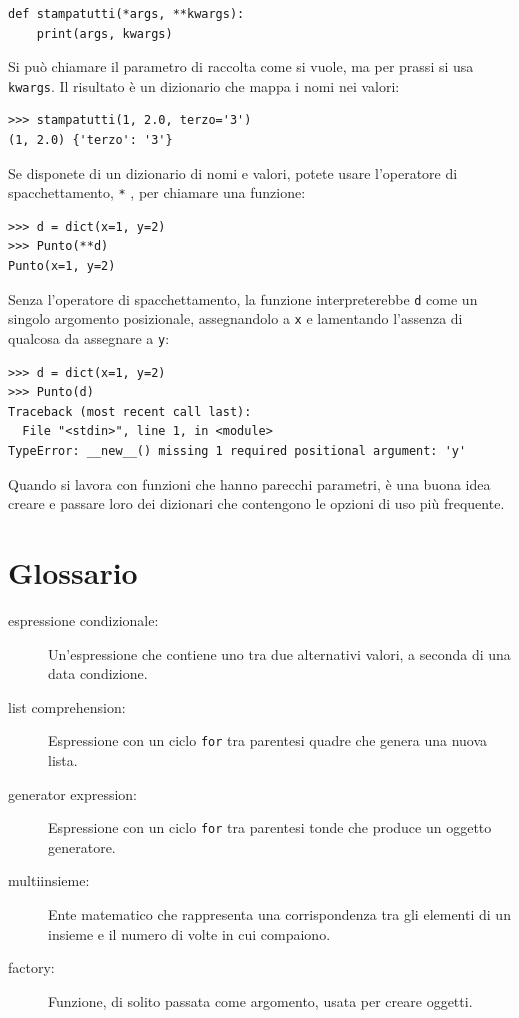 \documentclass[10pt]{book}
\begin{document}
\begin{verbatim}
def stampatutti(*args, **kwargs):
    print(args, kwargs)
\end{verbatim}
%
Si può chiamare il parametro di raccolta come si vuole, ma per prassi si usa
{\tt kwargs}.  Il risultato è un dizionario che mappa i nomi nei valori:

\begin{verbatim}
>>> stampatutti(1, 2.0, terzo='3')
(1, 2.0) {'terzo': '3'}
\end{verbatim}
%
Se disponete di un dizionario di nomi e valori, potete usare l'operatore di spacchettamento, {\tt **} , per chiamare una funzione:

\begin{verbatim}
>>> d = dict(x=1, y=2)
>>> Punto(**d)
Punto(x=1, y=2)
\end{verbatim}
%
Senza l'operatore di spacchettamento, la funzione interpreterebbe {\tt d} come un singolo argomento posizionale, assegnandolo a {\tt x} e lamentando l'assenza di qualcosa da assegnare a {\tt y}:

\begin{verbatim}
>>> d = dict(x=1, y=2)
>>> Punto(d)
Traceback (most recent call last):
  File "<stdin>", line 1, in <module>
TypeError: __new__() missing 1 required positional argument: 'y'
\end{verbatim}
%
Quando si lavora con funzioni che hanno parecchi parametri, è una buona idea creare e passare loro dei dizionari che contengono le opzioni di uso più frequente.


\section{Glossario}

\begin{description}

\item[espressione condizionale:] Un'espressione che contiene uno tra due alternativi valori, a seconda di una data condizione.

\item[list comprehension:] Espressione con un ciclo {\tt for} tra parentesi quadre che genera una nuova lista.

\item[generator expression:] Espressione con un ciclo {\tt for} tra parentesi tonde che produce un oggetto generatore.  

\item[multiinsieme:] Ente matematico che rappresenta una corrispondenza tra gli elementi di un insieme e il numero di volte in cui compaiono. 

\item[factory:] Funzione, di solito passata come argomento, usata per creare oggetti.

\end{description}
\end{document}
